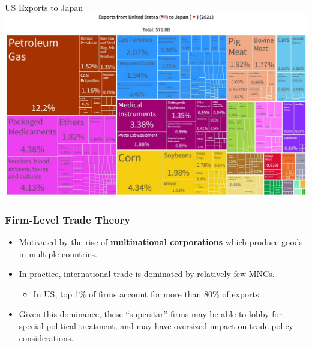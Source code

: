 \documentclass[handout]{beamer}
\begin{document}
\begin{frame}{\LARGE US Exports to Japan}
    \centering
\includegraphics[width=\textwidth,height=0.9\textheight,keepaspectratio]{US to Japan.JPG}
\end{frame}

\begin{frame} 
	\frametitle{\LARGE{Firm-Level Trade Theory}}
	\begin{itemize}
		\item Motivated by the rise of \textbf{multinational corporations} which produce goods in multiple countries. \pause
		\item In practice, international trade is dominated by relatively few MNCs.
		\begin{itemize}
			\item In US, top 1\% of firms account for more than 80\% of exports. \pause
		\end{itemize}
			\item Given this dominance, these ``superstar'' firms may be able to lobby for special political treatment, and may have oversized impact on trade policy considerations. 
	\end{itemize}
\end{frame}

\end{document}
